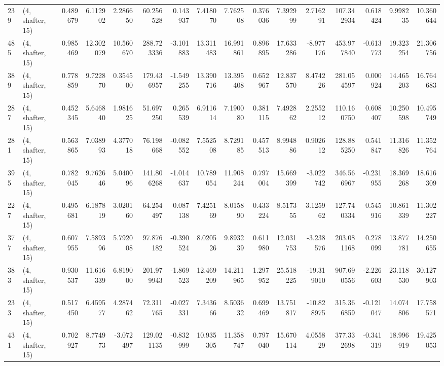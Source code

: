 \begin{tabular}{llrrrrrrrrrrrrrr}
239 &  (4, shafter, 15) &   0.489679 &   6.112902 &   2.286650 &    60.256528 &   0.143937 &   7.418070 &   7.762508 &  0.376036 &   7.392999 &   2.716291 &   107.342934 &  0.618424 &   9.998235 &  10.360644 \\
485 &  (4, shafter, 15) &   0.985469 &  12.302079 &  10.560670 &   288.723336 &  -3.101883 &  13.311483 &  16.991861 &  0.896895 &  17.633286 &  -8.977176 &   453.977840 & -0.613773 &  19.323254 &  21.306756 \\
389 &  (4, shafter, 15) &   0.778859 &   9.722870 &   0.354500 &   179.436957 &  -1.549255 &  13.390716 &  13.395408 &  0.652967 &  12.837570 &   8.474226 &   281.054597 &  0.000924 &  14.465203 &  16.764683 \\
287 &  (4, shafter, 15) &   0.452345 &   5.646840 &   1.981625 &    51.697250 &   0.265539 &   6.911614 &   7.190080 &  0.381115 &   7.492862 &   2.255212 &   110.160750 &  0.608407 &  10.250598 &  10.495749 \\
281 &  (4, shafter, 15) &   0.563865 &   7.038993 &   4.377018 &    76.198668 &  -0.082552 &   7.552508 &   8.729185 &  0.457513 &   8.994886 &   0.902612 &   128.885250 &  0.541847 &  11.316826 &  11.352764 \\
395 &  (4, shafter, 15) &   0.782045 &   9.762646 &   5.040096 &   141.806268 &  -1.014637 &  10.789054 &  11.908244 &  0.797004 &  15.669399 &  -3.022742 &   346.566967 & -0.231955 &  18.369268 &  18.616309 \\
227 &  (4, shafter, 15) &   0.495681 &   6.187819 &   3.020160 &    64.254497 &   0.087138 &   7.425169 &   8.015890 &  0.433224 &   8.517355 &   3.125962 &   127.740334 &  0.545916 &  10.861339 &  11.302227 \\
377 &  (4, shafter, 15) &   0.607955 &   7.589396 &   5.792008 &    97.876182 &  -0.390524 &   8.020526 &   9.893239 &  0.611980 &  12.031753 &  -3.238576 &   203.081168 &  0.278099 &  13.877781 &  14.250655 \\
383 &  (4, shafter, 15) &   0.930537 &  11.616339 &   6.819000 &   201.979943 &  -1.869523 &  12.469209 &  14.211965 &  1.297952 &  25.518225 & -19.319010 &   907.690556 & -2.226603 &  23.118530 &  30.127903 \\
233 &  (4, shafter, 15) &   0.517450 &   6.459577 &   4.287462 &    72.311765 &  -0.027331 &   7.343666 &   8.503632 &  0.699469 &  13.751817 & -10.828975 &   315.366859 & -0.121047 &  14.074806 &  17.758571 \\
431 &  (4, shafter, 15) &   0.702927 &   8.774973 &  -3.072497 &   129.021135 &  -0.832999 &  10.935305 &  11.358747 &  0.797040 &  15.670114 &   4.055829 &   377.332698 & -0.341319 &  18.996919 &  19.425053 \\

\end{tabular}

